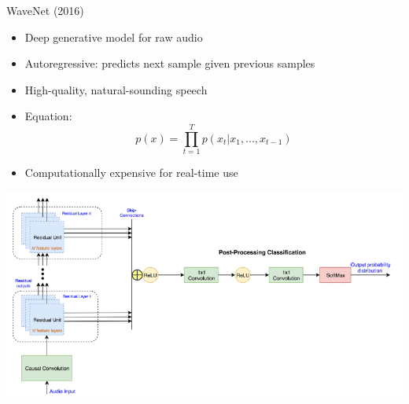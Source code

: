 \begin{frame}[allowframebreaks]{WaveNet (2016)}
    \begin{itemize}
        \item Deep generative model for raw audio
        \item Autoregressive: predicts next sample given previous samples
        \item High-quality, natural-sounding speech
        \item Equation:
        \[
            p(x) = \prod_{t=1}^{T} p(x_t | x_{1}, ..., x_{t-1})
        \]
        \item Computationally expensive for real-time use
    \end{itemize}
    \begin{center}
        \includegraphics[width=\textwidth,height=0.9\textheight,keepaspectratio]{images/audio-nlp/wavenet_architecture.png}
    \end{center}
\end{frame}

